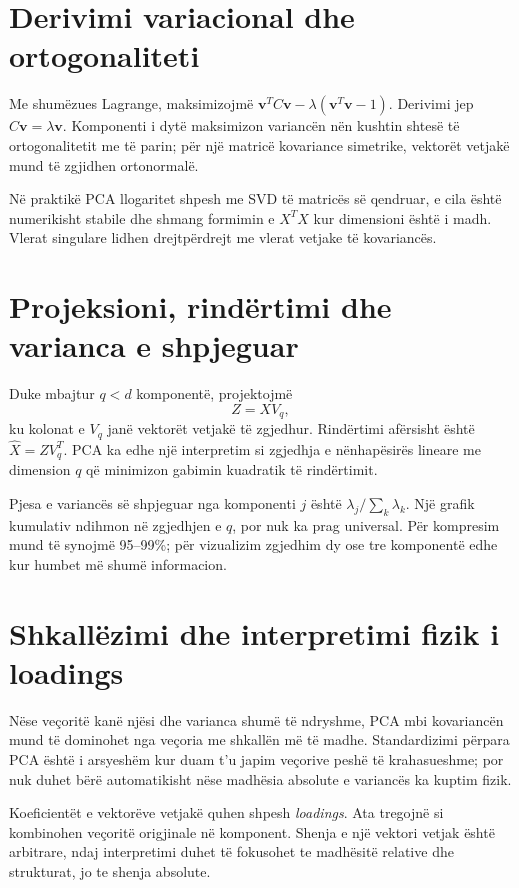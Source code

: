 \documentclass[12pt,a4paper,oneside]{book}
\begin{document}
\section{Derivimi variacional dhe ortogonaliteti}

Me shumëzues Lagrange, maksimizojmë $\mathbf v^TC\mathbf v-\lambda(\mathbf v^T\mathbf v-1)$. Derivimi jep $C\mathbf v=\lambda\mathbf v$. Komponenti i dytë maksimizon variancën nën kushtin shtesë të ortogonalitetit me të parin; për një matricë kovariance simetrike, vektorët vetjakë mund të zgjidhen ortonormalë.

Në praktikë PCA llogaritet shpesh me SVD të matricës së qendruar, e cila është numerikisht stabile dhe shmang formimin e $X^TX$ kur dimensioni është i madh. Vlerat singulare lidhen drejtpërdrejt me vlerat vetjake të kovariancës.

\section{Projeksioni, rindërtimi dhe varianca e shpjeguar}

Duke mbajtur $q<d$ komponentë, projektojmë
\[
Z=XV_q,
\]
ku kolonat e $V_q$ janë vektorët vetjakë të zgjedhur. Rindërtimi afërsisht është $\hat X=ZV_q^T$. PCA ka edhe një interpretim si zgjedhja e nënhapësirës lineare me dimension $q$ që minimizon gabimin kuadratik të rindërtimit.

Pjesa e variancës së shpjeguar nga komponenti $j$ është $\lambda_j/\sum_k\lambda_k$. Një grafik kumulativ ndihmon në zgjedhjen e $q$, por nuk ka prag universal. Për kompresim mund të synojmë 95--99\%; për vizualizim zgjedhim dy ose tre komponentë edhe kur humbet më shumë informacion.

\section{Shkallëzimi dhe interpretimi fizik i loadings}

Nëse veçoritë kanë njësi dhe varianca shumë të ndryshme, PCA mbi kovariancën mund të dominohet nga veçoria me shkallën më të madhe. Standardizimi përpara PCA është i arsyeshëm kur duam t'u japim veçorive peshë të krahasueshme; por nuk duhet bërë automatikisht nëse madhësia absolute e variancës ka kuptim fizik.

Koeficientët e vektorëve vetjakë quhen shpesh \emph{loadings}. Ata tregojnë si kombinohen veçoritë origjinale në komponent. Shenja e një vektori vetjak është arbitrare, ndaj interpretimi duhet të fokusohet te madhësitë relative dhe strukturat, jo te shenja absolute.
\end{document}
